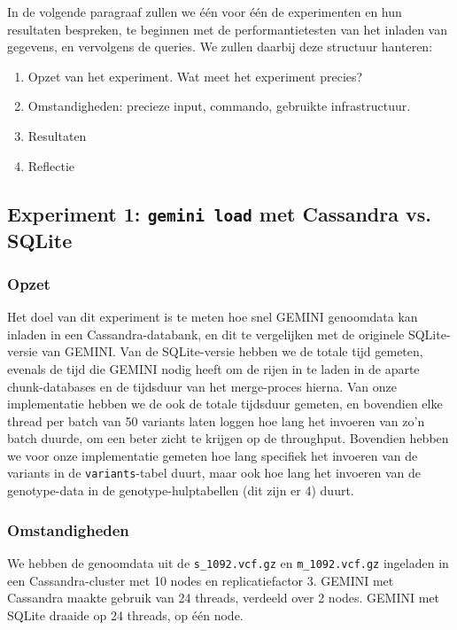 In de volgende paragraaf zullen we \'e\'en voor \'e\'en de experimenten en hun resultaten bespreken, te beginnen met de performantietesten van het inladen van gegevens, en vervolgens de queries. We zullen daarbij deze structuur hanteren:
\begin{enumerate}
\item Opzet van het experiment. Wat meet het experiment precies?
\item Omstandigheden: precieze input, commando, gebruikte infrastructuur.
\item Resultaten
\item Reflectie
\end{enumerate}

\subsection{Experiment 1: \texttt{gemini load} met Cassandra vs. SQLite}
\label{exp1}

\subsubsection{Opzet}

Het doel van dit experiment is te meten hoe snel GEMINI genoomdata kan inladen in een Cassandra-databank, en dit te vergelijken met de originele SQLite-versie van GEMINI. Van de SQLite-versie hebben we de totale tijd gemeten, evenals de tijd die GEMINI nodig heeft om de rijen in te laden in de aparte chunk-databases en de tijdsduur van het merge-proces hierna. Van onze implementatie hebben we de ook de totale tijdsduur gemeten, en bovendien elke thread per batch van 50 variants laten loggen hoe lang het invoeren van zo'n batch duurde, om een beter zicht te krijgen op de throughput. Bovendien hebben we voor onze implementatie gemeten hoe lang specifiek het invoeren van de variants in de \texttt{variants}-tabel duurt, maar ook hoe lang het invoeren van de genotype-data in de genotype-hulptabellen (dit zijn er 4) duurt. 

\subsubsection{Omstandigheden}
We hebben de genoomdata uit de \texttt{s\_1092.vcf.gz} en \texttt{m\_1092.vcf.gz} ingeladen in een Cassandra-cluster met 10 nodes en replicatiefactor 3. GEMINI met Cassandra maakte gebruik van 24 threads, verdeeld over 2 nodes. GEMINI met SQLite draaide op 24 threads, op \'e\'en node.

